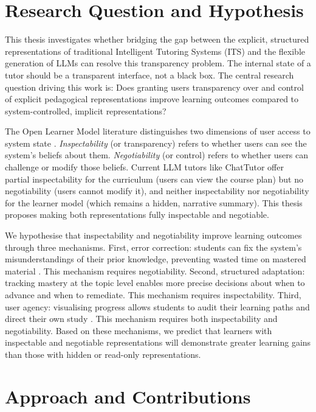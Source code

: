 \documentclass[logo,bsc,singlespacing,parskip,online]{infthesis}
\begin{document}
\section{Research Question and Hypothesis}

This thesis investigates whether bridging the gap between the explicit, structured representations of traditional Intelligent Tutoring Systems (ITS) \citep{vanlehn2011relative} and the flexible generation of LLMs can resolve this transparency problem. The internal state of a tutor should be a transparent interface, not a black box. The central research question driving this work is: Does granting users transparency over and control of explicit pedagogical representations improve learning outcomes compared to system-controlled, implicit representations?

The Open Learner Model literature distinguishes two dimensions of user access to system state \citep{bull2007invite, kay2013scrutability}. \textit{Inspectability} (or transparency) refers to whether users can see the system's beliefs about them. \textit{Negotiability} (or control) refers to whether users can challenge or modify those beliefs. Current LLM tutors like ChatTutor \citep{chen2024chattutor} offer partial inspectability for the curriculum (users can view the course plan) but no negotiability (users cannot modify it), and neither inspectability nor negotiability for the learner model (which remains a hidden, narrative summary). This thesis proposes making both representations fully inspectable and negotiable.

We hypothesise that inspectability and negotiability improve learning outcomes through three mechanisms. First, error correction: students can fix the system's misunderstandings of their prior knowledge, preventing wasted time on mastered material \citep{bull2010olm}. This mechanism requires negotiability. Second, structured adaptation: tracking mastery at the topic level enables more precise decisions about when to advance and when to remediate. This mechanism requires inspectability. Third, user agency: visualising progress allows students to audit their learning paths and direct their own study \citep{ryan2000sdt}. This mechanism requires both inspectability and negotiability. Based on these mechanisms, we predict that learners with inspectable and negotiable representations will demonstrate greater learning gains than those with hidden or read-only representations.

\section{Approach and Contributions}
\end{document}
